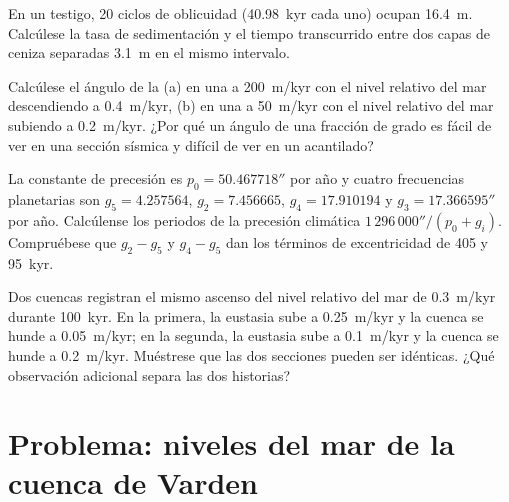 \begin{exercise}[$\star\star$]\label{exo:b3:sequence-stratigraphy:9}
En un testigo, 20 ciclos de oblicuidad (\qty{40.98}{kyr} cada uno) ocupan
\qty{16.4}{m}. Calcúlese la tasa de sedimentación y el tiempo transcurrido entre dos capas de ceniza
separadas \qty{3.1}{m} en el mismo intervalo.
\end{exercise}

\begin{exercise}[$\star\star\star$]\label{exo:b3:sequence-stratigraphy:10}
Calcúlese el ángulo de la  (a) en una  a
\qty{200}{m/kyr} con el nivel relativo del mar descendiendo a \qty{0.4}{m/kyr}, (b) en
una  a \qty{50}{m/kyr} con el nivel relativo del mar subiendo a
\qty{0.2}{m/kyr}.
¿Por qué un ángulo de una fracción de grado es fácil de ver en una sección sísmica y difícil de ver en un acantilado?
\end{exercise}

\begin{exercise}[$\star\star\star$]\label{exo:b3:sequence-stratigraphy:11}
La constante de precesión es $p_0 = 50.467718''$ por año y cuatro frecuencias planetarias
son $g_5 = 4.257564$, $g_2 = 7.456665$, $g_4 = 17.910194$ y
$g_3 = 17.366595''$ por año. Calcúlense los periodos de la precesión climática
$1\,296\,000''/(p_0 + g_i)$. Compruébese que $g_2 - g_5$ y $g_4 - g_5$ dan los
términos de excentricidad de 405 y \qty{95}{kyr}.
\end{exercise}

\begin{exercise}[$\star\star\star$]\label{exo:b3:sequence-stratigraphy:12}
Dos cuencas registran el mismo ascenso del nivel relativo del mar de \qty{0.3}{m/kyr} durante
\qty{100}{kyr}. En la primera, la eustasia sube a \qty{0.25}{m/kyr} y la
cuenca se hunde a \qty{0.05}{m/kyr}; en la segunda, la eustasia sube a
\qty{0.1}{m/kyr} y la cuenca se hunde a \qty{0.2}{m/kyr}. Muéstrese que las
dos secciones pueden ser idénticas.
¿Qué observación adicional separa las dos historias?
\end{exercise}

\section{Problema: niveles del mar de la cuenca de Varden}

